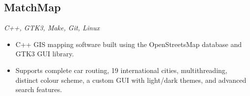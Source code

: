 \documentclass[10pt, a4paper]{article}
\begin{document}
\subsection*{MatchMap}
\textit{C++, GTK3, Make, Git, Linux}
\begin{itemize}
    \item C++ GIS mapping software built using the OpenStreetsMap database and GTK3 GUI library.
    \item Supports complete car routing, 19 international cities, multithreading, distinct colour scheme, a custom GUI with light/dark themes, and advanced search features.
\end{itemize}
\end{document}
